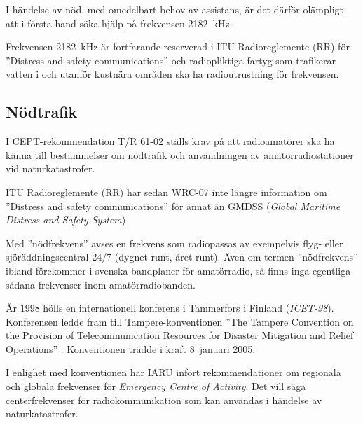 \begin{center}
\begin{minipage}{0.19\columnwidth}
\Huge{\selectfont{}\relax}
\end{minipage}
\begin{minipage}{0.7\columnwidth}
I händelse av nöd, med omedelbart behov av assistans, är det därför
olämpligt att i första hand söka hjälp på frekvensen \SI{2182}{\kilo\hertz}.
\end{minipage}
\end{center}

Frekvensen \SI{2182}{\kilo\hertz} är fortfarande reserverad i ITU
Radioreglemente (RR) \cite{ITU-RR} för ''Distress and safety communications''
och radiopliktiga fartyg som trafikerar vatten i och utanför kustnära områden
ska ha radioutrustning för frekvensen.

\subsection{Nödtrafik}
\label{nödtrafik}

I CEPT-rekommendation T/R 61-02 \cite{TR6102} ställs krav på att radioamatörer
ska ha känna till bestämmelser om nödtrafik och användningen av
amatörradiostationer vid naturkatastrofer.

ITU Radioreglemente (RR) \cite{ITU-RR} har sedan WRC-07 inte längre information
om ''Distress and safety communications'' för annat än
GMDSS (\emph{Global Maritime Distress and Safety System})

Med ''nödfrekvens'' avses en frekvens som radiopassas av exempelvis flyg- eller
sjöräddningscentral 24/7 (dygnet runt, året runt).
Även om termen ''nödfrekvens'' ibland förekommer i svenska bandplaner för
amatörradio, så finns inga egentliga sådana frekvenser inom amatörradiobanden.

År 1998 hölls en internationell konferens i Tammerfors i Finland
(\emph{ICET-98}).
Konferensen ledde fram till Tampere-konventionen ''The Tampere Convention on
the Provision of Telecommunication Resources for Disaster Mitigation and Relief
Operations'' \cite{TampereConvention}.
Konventionen trädde i kraft 8~januari 2005.

I enlighet med konventionen har IARU infört rekommendationer om regionala och
globala frekvenser för \emph{Emergency Centre of Activity}.
Det vill säga centerfrekvenser för radiokommunikation som kan användas i
händelse av naturkatastrofer.

